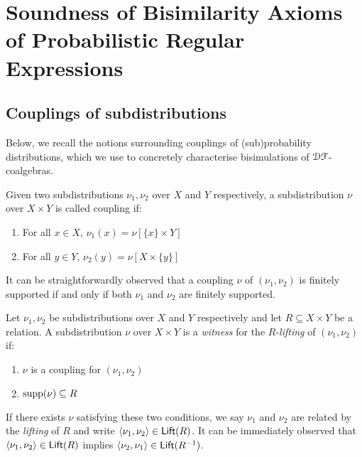 {}

\appendix
\chapter{Soundness of Bisimilarity Axioms of Probabilistic Regular Expressions}
\label{appendixlabel1}

\section{Couplings of subdistributions}
Below, we recall the notions surrounding couplings of (sub)probability distributions, which we use to concretely characterise bisimulations of $\mathcal{D} \mathcal{F}$-coalgebras.
\begin{definition}\label{def:coupling}
    Given two subdistributions $\nu_1, \nu_2$ over $X$ and $Y$ respectively, a subdistribution $\nu$ over $X \times Y$ is called coupling if:
    \begin{enumerate}
        \item For all $x \in X$, $\nu_1(x) = \nu[\{x\}\times Y]$
        \item For all $y \in Y$, $\nu_2(y)= \nu[X \times \{y\}]$
    \end{enumerate} 
\end{definition}
It can be straightforwardly observed that a coupling $\nu$ of $(\nu_1, \nu_2)$ is finitely supported if and only if both $\nu_1$ and $\nu_2$ are finitely supported.
\begin{definition}\label{def:lifting}
    Let $\nu_1, \nu_2$ be subdistributions over $X$ and $Y$ respectively and let $R \subseteq X \times Y$ be a relation. A subdistribution $\nu$ over $X \times Y$ is a \emph{witness} for the $R$-\emph{lifting} of $(\nu_1, \nu_2)$ if:
    \begin{enumerate}
        \item $\nu$ is a coupling for $(\nu_1, \nu_2)$
        \item $\operatorname{supp}(\nu) \subseteq R$
    \end{enumerate}
\end{definition}
If there exists $\nu$ satisfying these two conditions, we say $\nu_1$ and $\nu_2$ are related by the \emph{lifting} of $R$ and write $\langle\nu_1 , \nu_2 \rangle \in \mathsf{Lift}(R)$. It can be immediately observed that $\langle \nu_1 , \nu_2 \rangle \in \mathsf{Lift}(R)$ implies $\langle \nu_2 , \nu_1 \rangle \in \mathsf{Lift}({R^{-1}})$.

